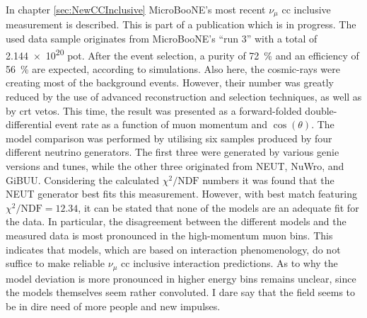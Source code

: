 In chapter \ref{sec:NewCCInclusive} MicroBooNE's most recent $\nu_\mu$ \gls{cc} inclusive measurement is described. This is part of a publication which is in progress. The used data sample originates from MicroBooNE's ``run 3'' with a total of \num{2.144e20} \gls{pot}. After the event selection, a purity of \SI{72}{\percent} and an efficiency of \SI{56}{\percent} are expected, according to simulations. Also here, the cosmic-rays were creating most of the background events. However, their number was greatly reduced by the use of advanced reconstruction and selection techniques, as well as by \gls{crt} vetos. This time, the result was presented as a forward-folded double-differential event rate as a function of muon momentum and $\cos{(\theta)}$. The model comparison was performed by utilising six samples produced by four different neutrino generators. The first three were generated by various \gls{genie} versions and tunes, while the other three originated from NEUT, NuWro, and GiBUU. Considering the calculated $\chi^2/\text{NDF}$ numbers it was found that the NEUT generator best fits this measurement. However, with best match featuring $\chi^2/\text{NDF} = \num{12.34}$, it can be stated that none of the models are an adequate fit for the data. In particular, the disagreement between the different models and the measured data is most pronounced in the high-momentum muon bins. This indicates that models, which are based on interaction phenomenology, do not suffice to make reliable $\nu_\mu$ \gls{cc} inclusive interaction predictions. As to why the model deviation is more pronounced in higher energy bins remains unclear, since the models themselves seem rather convoluted. I dare say that the field seems to be in dire need of more people and new impulses.

